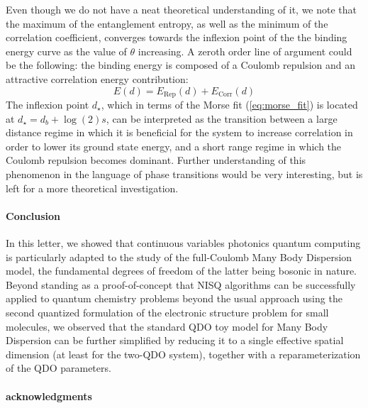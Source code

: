 \documentclass[reprint, amsmath, amssymb, floatfix, aps, pra]{revtex4-2}
\begin{document}
    Even though we do not have a neat theoretical understanding of it, we note that the maximum of the entanglement entropy, as well as the minimum of the correlation coefficient, converges towards the inflexion point of the the binding energy curve as the value of $\theta$ increasing. A zeroth order line of argument could be the following: the binding energy is composed of a Coulomb repulsion and an attractive correlation energy contribution:
    \begin{equation*}
        E(d)=E_\text{Rep}(d)+E_\text{Corr}(d)
    \end{equation*}
    The inflexion point $d_\star$, which in terms of the Morse fit (\ref{eq:morse_fit}) is located at $d_\star = d_b + \log(2)s$,
    can be interpreted as the transition between a large distance regime in which it is beneficial for the system to increase correlation in order to lower its ground state energy, and a short range regime in which the Coulomb repulsion becomes dominant. Further understanding of this phenomenon in the language of phase transitions would be very interesting, but is left for a more theoretical investigation.



\paragraph*{Conclusion}

    In this letter, we showed that continuous variables photonics quantum computing is particularly adapted to the study of the full-Coulomb Many Body Dispersion model, the fundamental degrees of freedom of the latter being bosonic in nature. Beyond standing as a proof-of-concept that NISQ algorithms can be successfully applied to quantum chemistry problems beyond the usual approach using the second quantized formulation of the electronic structure problem for small molecules, we observed that the standard QDO toy model for Many Body Dispersion can be further simplified by reducing it to a single effective spatial dimension (at least for the two-QDO system), together with a reparameterization of the QDO parameters.
    \newline

\paragraph*{acknowledgments}
\end{document}
